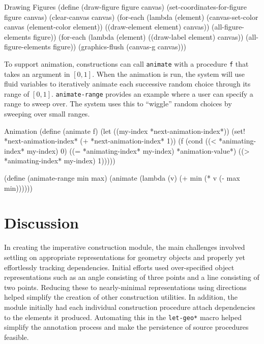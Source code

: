 \begin{code-listing}
[label=draw-figure]
{Drawing Figures}
(define (draw-figure figure canvas)
  (set-coordinates-for-figure figure canvas)
  (clear-canvas canvas)
  (for-each
   (lambda (element)
     (canvas-set-color canvas (element-color element))
     ((draw-element element) canvas))
   (all-figure-elements figure))
  (for-each
   (lambda (element)
     ((draw-label element) canvas))
   (all-figure-elements figure))
  (graphics-flush (canvas-g canvas)))
\end{code-listing}

To support animation, constructions can call \texttt{animate} with a
procedure \texttt{f} that takes an argument in $[0, 1]$. When the
animation is run, the system will use fluid variables to iteratively
animate each successive random choice through its range of
$[0,1]$. \texttt{animate-range} provides an example where a user can
specify a range to sweep over. The system uses this to ``wiggle''
random choices by sweeping over small ranges.

\enlargethispage*{\baselineskip}

\begin{code-listing}
[label=animation]
{Animation}
(define (animate f)
  (let ((my-index *next-animation-index*))
    (set! *next-animation-index* (+ *next-animation-index* 1))
    (f (cond ((< *animating-index* my-index) 0)
             ((= *animating-index* my-index) *animation-value*)
             ((> *animating-index* my-index) 1)))))

(define (animate-range min max)
  (animate (lambda (v) (+ min (* v (- max min))))))
\end{code-listing}

\section{Discussion}

In creating the imperative construction module, the main challenges
involved settling on appropriate representations for geometry objects
and properly yet effortlessly tracking dependencies. Initial efforts
used over-specified object representations such as an angle consisting
of three points and a line consisting of two points. Reducing these to
nearly-minimal representations using directions helped simplify the
creation of other construction utilities. In addition, the module
initially had each individual construction procedure attach
dependencies to the elements it produced. Automating this in the
\texttt{let-geo*} macro helped simplify the annotation process and
make the persistence of source procedures feasible.

